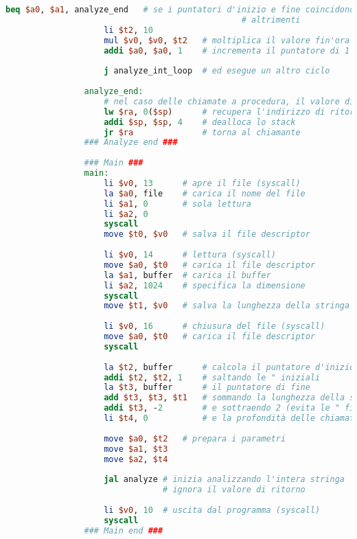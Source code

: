 \begin{center}
\begin{lstlisting}[language=mips, gobble=14, stepnumber=1]
                    beq $a0, $a1, analyze_end   # se i puntatori d'inizio e fine coincidono allora era l'ultimo carattere
                                                # altrimenti
                    li $t2, 10
                    mul $v0, $v0, $t2   # moltiplica il valore fin'ora calcolato per 10
                    addi $a0, $a0, 1    # incrementa il puntatore di 1 (prossimo carattere)
                    
                    j analyze_int_loop  # ed esegue un altro ciclo
                    
                analyze_end:
                    # nel caso delle chiamate a procedura, il valore di ritorno è lo stesso (valutazione dell'espressione)
                    lw $ra, 0($sp)      # recupera l'indirizzo di ritorno
                    addi $sp, $sp, 4    # dealloca lo stack
                    jr $ra              # torna al chiamante
                ### Analyze end ###
                
                ### Main ###
                main:
                    li $v0, 13      # apre il file (syscall)
                    la $a0, file    # carica il nome del file
                    li $a1, 0       # sola lettura
                    li $a2, 0
                    syscall
                    move $t0, $v0   # salva il file descriptor
                    
                    li $v0, 14      # lettura (syscall)
                    move $a0, $t0   # carica il file descriptor
                    la $a1, buffer  # carica il buffer
                    li $a2, 1024    # specifica la dimensione
                    syscall
                    move $t1, $v0   # salva la lunghezza della stringa
                    
                    li $v0, 16      # chiusura del file (syscall)
                    move $a0, $t0   # carica il file descriptor
                    syscall
                
                    la $t2, buffer      # calcola il puntatore d'inizio
                    addi $t2, $t2, 1    # saltando le " iniziali
                    la $t3, buffer      # il puntatore di fine
                    add $t3, $t3, $t1   # sommando la lunghezza della stringa
                    addi $t3, -2        # e sottraendo 2 (evita le " finali)
                    li $t4, 0           # e la profondità delle chiamate iniziale
                    
                    move $a0, $t2   # prepara i parametri
                    move $a1, $t3
                    move $a2, $t4
                    
                    jal analyze # inizia analizzando l'intera stringa
                                # ignora il valore di ritorno
                    
                    li $v0, 10  # uscita dal programma (syscall)
                    syscall
                ### Main end ###\end{lstlisting}
        \end{center}
		